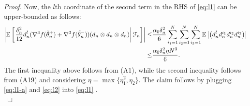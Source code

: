 \begin{proof}
Now, the $l$th coordinate of the second term in the RHS of \eqref{eq:l1} can be upper-bounded as follows:
\begin{align}
\left|\mathbb{E}\left[\left.\frac{\delta_n^2}{12} d_n^l (\nabla^3 f(\tilde  \theta_n^+)+\nabla^3 f(\tilde  \theta_n^-))(d_n \otimes d_n \otimes d_n)\right| \mathcal{F}_n\right] \right| \le& \dfrac{\alpha_0 \delta_n^2}{6} \sum_{i_1=1}^N\sum_{i_2=1}^N\sum_{i_3=1}^N \mathbb{E} \left|\left( d_n^l d_n^{i_1} d_n^{i_2} d_n^{i_3}\right)\right|\nonumber\\
\le & \dfrac{\alpha_0 \delta_n^2\eta N^3}{6}.\label{eq:l2}
\end{align}
The first inequality above follows from (A1), while the second inequality follows from (A19) and considering $\eta = \max \{\eta_1^2, \eta_2\}$. The claim follows by plugging \eqref{eq:l1-a} and \eqref{eq:l2} into \eqref{eq:l1} .\\
\end{proof}
%
%

